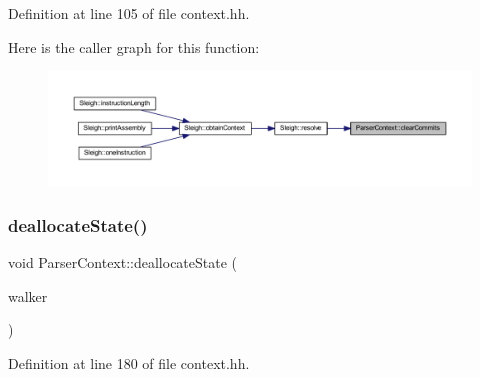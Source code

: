 Definition at line 105 of file context.\+hh.

Here is the caller graph for this function\+:
\nopagebreak
\begin{figure}[H]
\begin{center}
\leavevmode
\includegraphics[width=350pt]{class_parser_context_ab1b9f2de6217feb73966e15ef89ab4f4_icgraph}
\end{center}
\end{figure}
\mbox{\label{class_parser_context_aeadc3c9beab067825f0f0c0a25618f84}} 
\subsubsection{\texorpdfstring{deallocateState()}{deallocateState()}}
{\footnotesize\ttfamily void Parser\+Context\+::deallocate\+State (\begin{DoxyParamCaption}\item[{\mbox{\hyperlink{class_parser_walker_change}{Parser\+Walker\+Change}} \&}]{walker }\end{DoxyParamCaption})\hspace{0.3cm}{\ttfamily [inline]}}



Definition at line 180 of file context.\+hh.

